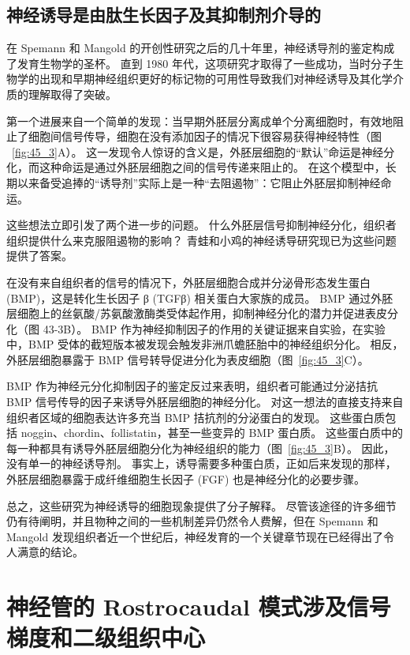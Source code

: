 \subsection{神经诱导是由肽生长因子及其抑制剂介导的}

在 Spemann 和 Mangold 的开创性研究之后的几十年里，神经诱导剂的鉴定构成了发育生物学的圣杯。
直到 1980 年代，这项研究才取得了一些成功，当时分子生物学的出现和早期神经组织更好的标记物的可用性导致我们对神经诱导及其化学介质的理解取得了突破。


第一个进展来自一个简单的发现：当早期外胚层分离成单个分离细胞时，有效地阻止了细胞间信号传导，细胞在没有添加因子的情况下很容易获得神经特性（图 ~\ref{fig:45_3}A）。
这一发现令人惊讶的含义是，外胚层细胞的“默认”命运是神经分化，而这种命运是通过外胚层细胞之间的信号传递来阻止的。
在这个模型中，长期以来备受追捧的“诱导剂”实际上是一种“去阻遏物”：它阻止外胚层抑制神经命运。


这些想法立即引发了两个进一步的问题。
什么外胚层信号抑制神经分化，组织者组织提供什么来克服阻遏物的影响？
青蛙和小鸡的神经诱导研究现已为这些问题提供了答案。


在没有来自组织者的信号的情况下，外胚层细胞合成并分泌骨形态发生蛋白 (BMP)，这是转化生长因子 β (TGFβ) 相关蛋白大家族的成员。
BMP 通过外胚层细胞上的丝氨酸/苏氨酸激酶类受体起作用，抑制神经分化的潜力并促进表皮分化（图 43-3B）。
BMP 作为神经抑制因子的作用的关键证据来自实验，在实验中，BMP 受体的截短版本被发现会触发非洲爪蟾胚胎中的神经组织分化。
相反，外胚层细胞暴露于 BMP 信号转导促进分化为表皮细胞（图~\ref{fig:45_3}C）。


BMP 作为神经元分化抑制因子的鉴定反过来表明，组织者可能通过分泌拮抗 BMP 信号传导的因子来诱导外胚层细胞的神经分化。
对这一想法的直接支持来自组织者区域的细胞表达许多充当 BMP 拮抗剂的分泌蛋白的发现。
这些蛋白质包括 noggin、chordin、follistatin，甚至一些变异的 BMP 蛋白质。
这些蛋白质中的每一种都具有诱导外胚层细胞分化为神经组织的能力（图~\ref{fig:45_3}B）。
因此，没有单一的神经诱导剂。
事实上，诱导需要多种蛋白质，正如后来发现的那样，外胚层细胞暴露于成纤维细胞生长因子 (FGF) 也是神经分化的必要步骤。


总之，这些研究为神经诱导的细胞现象提供了分子解释。 尽管该途径的许多细节仍有待阐明，并且物种之间的一些机制差异仍然令人费解，但在 Spemann 和 Mangold 发现组织者近一个世纪后，神经发育的一个关键章节现在已经得出了令人满意的结论。



\section{神经管的 Rostrocaudal 模式涉及信号梯度和二级组织中心}

